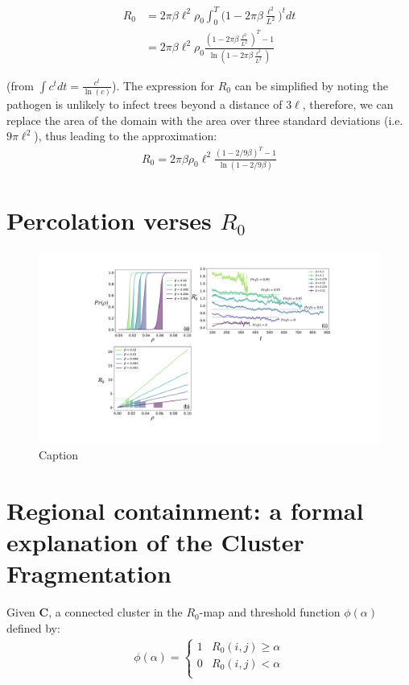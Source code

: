 \begin{equation} \label{eq1}
\begin{split}
R_0 & = 2\pi\beta\ell^2\rho_0 \int ^T _0 \big(1 - 2\pi\beta\frac{\ell^2}{L^2} \big)^t dt \\
 & = 2\pi\beta\ell^2\rho_0 \frac{ (1 - 2\pi \beta\frac{\ell^2}{L^2})^T - 1}{\ln(1 - 2\pi\beta\frac{\ell^2}{L^2})}
\end{split}
\end{equation}

(from $\int c^t dt = \frac{c^t}{\ln(c)}$). The expression for $R_0$ can be simplified by noting the pathogen is unlikely to infect trees beyond a distance of $3\ell$, therefore, we can replace the area of the domain with the area over three standard deviations (i.e. $9\pi\ell^2$), thus leading to the approximation:
\begin{align*}
    R_0 = 2\pi\beta\rho_0\ell^2 \frac{(1 - 2/9\beta)^T - 1}{\ln(1-2/9\beta)}
\end{align*}

\chapter{Percolation verses $R_0$}

\begin{figure}
    \centering
    \includegraphics[scale=0.35]{appendix/figures/app1.pdf}
    \caption{Caption}
    \label{fig:my_label}
\end{figure}

\blindtext


\chapter{Regional containment: a formal explanation of the Cluster Fragmentation}
\label{section:alpha-step}
Given $\mathbf{C}$, a connected cluster in the $R_0$-map and threshold function $\phi(\alpha)$ defined by:
\begin{align}
\label{eq:alpha-step}
\phi(\alpha) = \left\{ \begin{array}{cc} 
                1 & R_0(i, j) \geq \alpha \\
                0 & R_0(i, j) < \alpha \\
                \end{array} \right.
\end{align}


